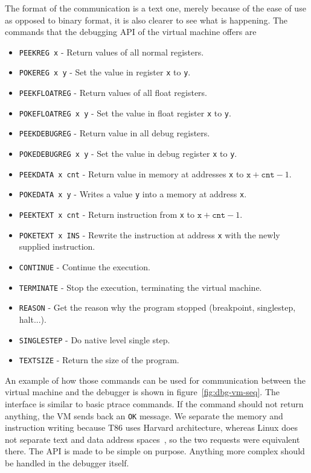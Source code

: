 The format of the communication is a text one, merely because of the ease
of use as opposed to binary format, it is also clearer to see what is
happening. The commands that the debugging API of the virtual machine offers
are
\begin{itemize}
    \item \texttt{PEEKREG x} - Return values of all normal registers.
    \item \texttt{POKEREG x y} - Set the value in register \texttt{x} to
        \texttt{y}.
    \item \texttt{PEEKFLOATREG} - Return values of all float registers.
    \item \texttt{POKEFLOATREG x y} - Set the value in float register
        \texttt{x} to \texttt{y}.
    \item \texttt{PEEKDEBUGREG} - Return value in all debug registers.
    \item \texttt{POKEDEBUGREG x y} - Set the value in debug register
        \texttt{x} to \texttt{y}.
    \item \texttt{PEEKDATA x cnt} - Return value in memory at addresses
        \texttt{x} to $\texttt{x} + \texttt{cnt} - 1$.
    \item \texttt{POKEDATA x y} - Writes a value \texttt{y} into a memory at
        address \texttt{x}.
    \item \texttt{PEEKTEXT x cnt} - Return instruction from \texttt{x} to $\texttt{x} + \texttt{cnt} - 1$.
    \item \texttt{POKETEXT x INS} - Rewrite the instruction at address
        \texttt{x} with the newly supplied instruction.
    \item \texttt{CONTINUE} - Continue the execution.
    \item \texttt{TERMINATE} - Stop the execution, terminating the virtual machine.
    \item \texttt{REASON} - Get the reason why the program stopped (breakpoint,
        singlestep, halt...).
    \item \texttt{SINGLESTEP} - Do native level single step.
    \item \texttt{TEXTSIZE} - Return the size of the program.
\end{itemize}

An example of how those commands can be used for communication between the
virtual machine and the debugger is shown in figure~\ref{fig:dbg-vm-seq}. The
interface is similar to basic ptrace commands. If the command should not return
anything, the VM sends back an \texttt{OK} message. We separate the memory and
instruction writing because T86 uses Harvard architecture, whereas Linux does
not separate text and data address spaces~\cite{ptrace}, so the two requests
were equivalent there. The API is made to be simple on purpose. Anything more
complex should be handled in the debugger itself.

